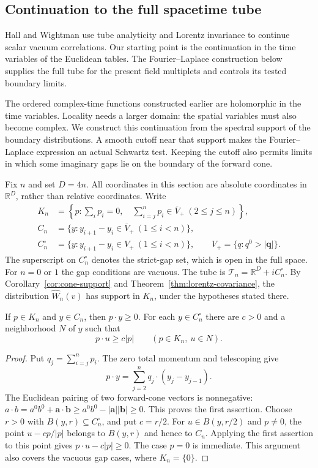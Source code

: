\subsection{Continuation to the full spacetime tube}
\label{sec:full-tube}

Hall and Wightman \cite[parts I--III]{HallWightman57} use tube
analyticity and Lorentz invariance to continue scalar vacuum
correlations. Our starting point is the continuation in the time
variables of the Euclidean tables. The Fourier--Laplace construction
below supplies the full tube for the present field multiplets and
controls its tested boundary limits.

The ordered complex-time functions constructed earlier are holomorphic in
the time variables. Locality needs a larger domain: the spatial variables
must also become complex. We construct this continuation from the spectral
support of the boundary distributions. A smooth cutoff near that support
makes the Fourier--Laplace expression an actual Schwartz test. Keeping the
cutoff also permits limits in which some imaginary gaps lie on the boundary
of the forward cone.

Fix $n$ and set $D=4n$. All coordinates in this section are absolute
coordinates in $\mathbb R^D$, rather than relative coordinates. Write
\begin{align*}
 K_n&=\left\{p:\sum_i p_i=0,\quad
                  \sum_{i=j}^n p_i\in\overline V_+\ (2\leq j\leq n)\right\},\\
 C_n&=\{y:y_{i+1}-y_i\in\overline V_+\ (1\leq i<n)\},\\
 C_n^\circ&=\{y:y_{i+1}-y_i\in V_+\ (1\leq i<n)\},
 \qquad V_+=\{q:q^0>|\mathbf q|\}.
\end{align*}
The superscript on $C_n^\circ$ denotes the strict-gap set, which is open
in the full space. For $n=0$ or $1$ the gap conditions are vacuous.
The tube is $\mathcal T_n=\mathbb R^D+iC_n^\circ$.
By Corollary~\ref{cor:cone-support} and
Theorem~\ref{thm:lorentz-covariance}, the distribution
$\widehat W_n(v)$ has support in $K_n$, under the hypotheses stated there.

\begin{lemma}\label{lem:tube-margin}
If $p\in K_n$ and $y\in C_n$, then $p\cdot y\geq0$.
For each $y\in C_n^\circ$ there are $c>0$ and a neighborhood $N$ of
$y$ such that
\[
 p\cdot u\geq c|p|\qquad(p\in K_n,\ u\in N).
\]
\end{lemma}
\begin{proof}
Put $q_j=\sum_{i=j}^n p_i$. The zero total momentum and telescoping give
\[
 p\cdot y=\sum_{j=2}^n q_j\cdot(y_j-y_{j-1}).
\]
The Euclidean pairing of two forward-cone vectors is nonnegative:
$a\cdot b=a^0b^0+\mathbf a\cdot\mathbf b
\geq a^0b^0-|\mathbf a||\mathbf b|\geq0$.
This proves the first assertion. Choose $r>0$ with
$B(y,r)\subseteq C_n^\circ$, and put $c=r/2$.
For $u\in B(y,r/2)$ and $p\ne0$, the point
$u-cp/|p|$ belongs to $B(y,r)$ and hence to $C_n$.
Applying the first assertion to this point gives
$p\cdot u-c|p|\geq0$. The case $p=0$ is immediate.
This argument also covers the vacuous gap cases, where $K_n=\{0\}$.
\end{proof}

